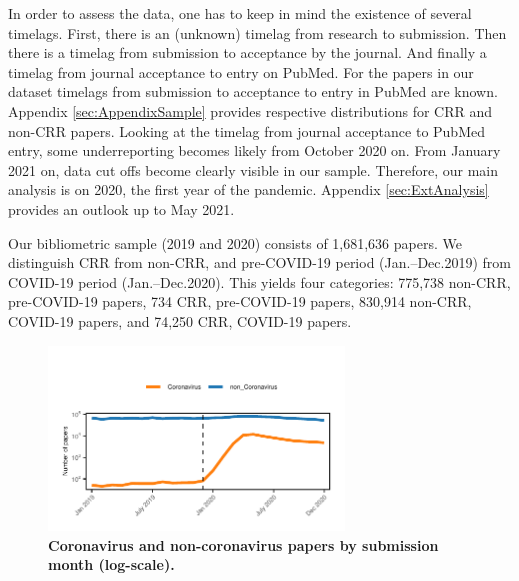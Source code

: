 In order to assess the data, one has to keep in mind the existence of several timelags. First, there is an (unknown) timelag from research to submission. Then there is a timelag from submission to acceptance by the journal. And finally a timelag from journal acceptance to entry on PubMed. For the papers in our dataset timelags from submission to acceptance to entry in PubMed are known. Appendix \ref{sec:AppendixSample} provides respective distributions for CRR and non-CRR papers. Looking at the timelag from journal acceptance to PubMed entry, some underreporting becomes likely from October 2020 on. From January 2021 on, data cut offs become clearly visible in our sample. Therefore, our main analysis is on 2020, the first year of the pandemic. Appendix \ref{sec:ExtAnalysis} provides an outlook up to May 2021. 

Our bibliometric sample (2019 and 2020) consists of 1,681,636 papers. We distinguish CRR from non-CRR, and pre-COVID-19 period (Jan.--Dec.2019) from COVID-19 period (Jan.--Dec.2020). This yields four categories: 775,738 non-CRR, pre-COVID-19 papers, 734 CRR, pre-COVID-19 papers, 830,914 non-CRR, COVID-19 papers, and 74,250 CRR, COVID-19 papers.


\begin{figure}[!h]
\includegraphics[width=0.7\textwidth]{1_chapter1/figures/Fig1.pdf} %
\caption{\bf Coronavirus and non-coronavirus papers by submission month (log-scale).}
\label{figure1} 
\end{figure}

